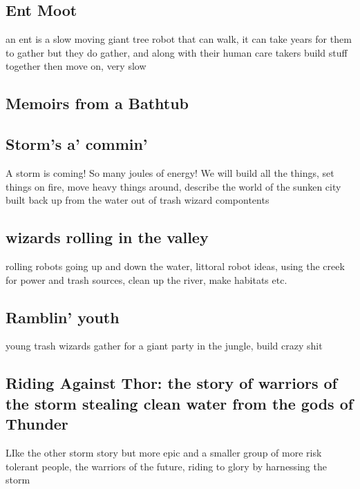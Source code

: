 \subsection{Ent Moot}\label{ent-moot}

an ent is a slow moving giant tree robot that can walk, it can take
years for them to gather but they do gather, and along with their human
care takers build stuff together then move on, very slow

\subsection{Memoirs from a Bathtub}\label{memoirs-from-a-bathtub}

\subsection{Storm's a' commin'}\label{storms-a-commin}

A storm is coming! So many joules of energy! We will build all the
things, set things on fire, move heavy things around, describe the world
of the sunken city built back up from the water out of trash wizard
compontents

\subsection{wizards rolling in the
valley}\label{wizards-rolling-in-the-valley}

rolling robots going up and down the water, littoral robot ideas, using
the creek for power and trash sources, clean up the river, make habitats
etc.

\subsection{Ramblin' youth}\label{ramblin-youth}

young trash wizards gather for a giant party in the jungle, build crazy
shit

\subsection{Riding Against Thor: the story of warriors of the storm
stealing clean water from the gods of
Thunder}\label{riding-against-thor-the-story-of-warriors-of-the-storm-stealing-clean-water-from-the-gods-of-thunder}

LIke the other storm story but more epic and a smaller group of more
risk tolerant people, the warriors of the future, riding to glory by
harnessing the storm

